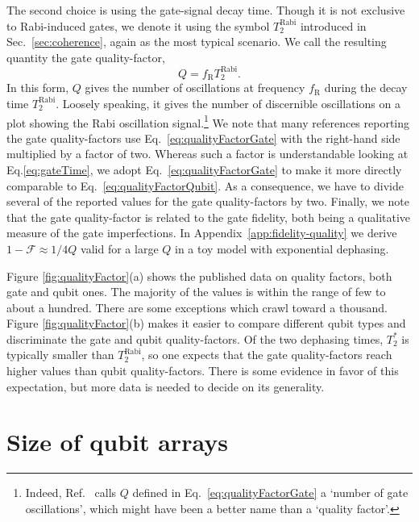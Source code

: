 \documentclass[aps, prx, showpacs, twocolumn, superscriptaddress, notitlepage, longbibliography, floatfix, nofootinbib]{revtex4-2}
\newcommand{\TRabi}{T_2^\mathrm{Rabi}}
\newcommand{\recheck}[1]{{#1}}
\begin{document}
The second choice is using the gate-signal decay time. Though it is not exclusive to Rabi-induced gates, we denote it using the symbol $ \TRabi$ introduced in Sec.~\ref{sec:coherence}, again as the most typical scenario. We call the resulting quantity the gate quality-factor,
\begin{equation}
Q = f_\mathrm{R}  \TRabi.
\label{eq:qualityFactorGate}
\end{equation}
In this form, $Q$ gives the number of oscillations at frequency $f_\mathrm{R}$ during the decay time $ \TRabi$. Loosely speaking, it gives the number of discernible oscillations on a plot showing the Rabi oscillation signal.\footnote{Indeed, Ref.~\cite{veldhorst_two-qubit_2015} calls $Q$ defined in Eq.~\eqref{eq:qualityFactorGate} a `number of gate oscillations', which might have been a better name than a `quality factor'.} We note that many references reporting the gate quality-factors use Eq.~\eqref{eq:qualityFactorGate} with the right-hand side multiplied by a factor of two. Whereas such a factor is understandable looking at Eq.\eqref{eq:gateTime}, we adopt Eq.~\eqref{eq:qualityFactorGate} to make it more directly comparable to Eq.~\ref{eq:qualityFactorQubit}. As a consequence, we have to divide several of the reported values for the gate quality-factors by two. Finally, we note that the gate quality-factor is related to the gate fidelity, both being a qualitative measure of the gate imperfections. In Appendix~\ref{app:fidelity-quality} we derive $1-\mathcal{F} \approx 1/4Q$ valid for a large $Q$ in a toy model with exponential dephasing.


Figure \ref{fig:qualityFactor}(a) shows the published data on quality factors, both gate and qubit ones. \recheck{The majority of the values is within the range of few to about a hundred. There are some exceptions which crawl toward a thousand.} Figure \ref{fig:qualityFactor}(b) makes it easier to compare different qubit types and discriminate the gate and qubit quality-factors. 
Of the two dephasing times, $T_2^*$ is typically smaller than $ \TRabi$, \recheck{so one expects that the gate quality-factors reach higher values  than qubit quality-factors.
There is some evidence in favor of this expectation, but more data is needed to decide on its generality.}


\section{Size of qubit arrays}
\end{document}
